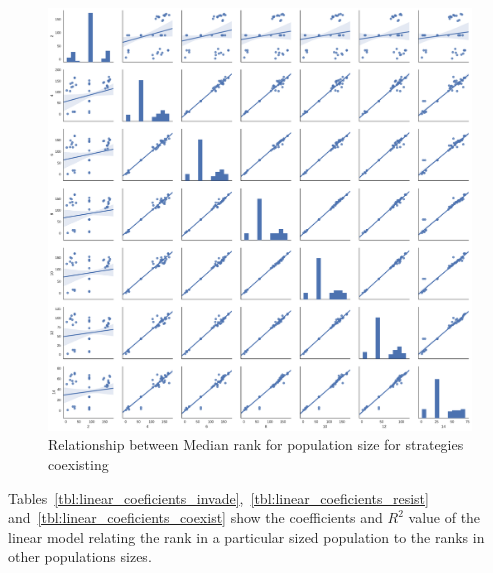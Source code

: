 \documentclass{article}
\begin{document}
\begin{figure}[!hbtp]
    \centering
    \includegraphics[width=\textwidth]{../img/relationship_between_median_ranks_coexist.pdf}
    \caption{Relationship between Median rank for population size for strategies
    coexisting}
    \label{fig:relationship_ranks_v_size_coexist}
\end{figure}

Tables~\ref{tbl:linear_coeficients_invade},~\ref{tbl:linear_coeficients_resist}
and~\ref{tbl:linear_coeficients_coexist} show the coefficients and \(R^2\) value
of the linear model relating the rank in a particular sized population to the
ranks in other populations sizes.
\end{document}
